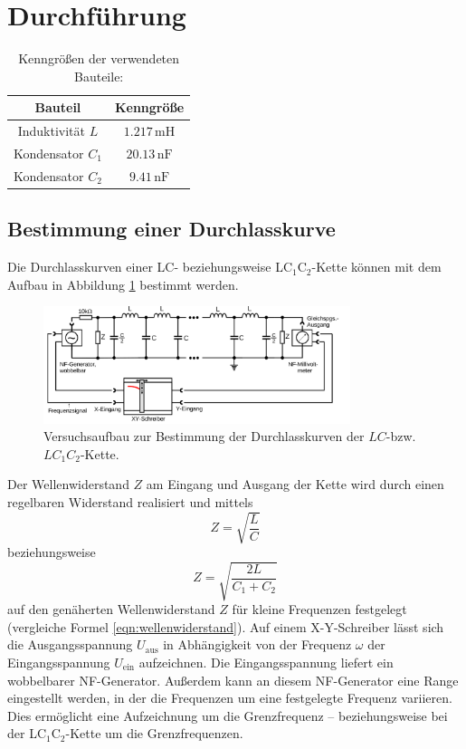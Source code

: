 \section{Durchführung}
\label{sec:Durchführung}

\begin{table}
	\caption{Kenngrößen der verwendeten Bauteile: }
	\label{tab:bauteile}
	\centering
	\begin{tabular}{cc}
		\toprule
		Bauteil            & Kenngröße                 \\
		\midrule
		Induktivität $L $ & $1.217 \,\si{\milli\henry}$ \\
		Kondensator $C_1$  & $20.13 \,\si{\nano\farad}$  \\
		Kondensator $C_2$  & $9.41\,\si{\nano\farad}$    \\
		\bottomrule
	\end{tabular}
\end{table}
\subsection{Bestimmung einer Durchlasskurve}
Die Durchlasskurven einer LC- beziehungsweise LC$_1$C$_2$-Kette können
mit dem Aufbau in Abbildung \ref{fig:durchlasskurve} bestimmt werden.
\begin{figure}
	\centering
	\includegraphics[width=0.8\textwidth]{Bilder/durchlasskurve.png}
	\caption{Versuchsaufbau zur Bestimmung der Durchlasskurven der $LC$-bzw. $LC_1C_2$-Kette. \cite{Anleitung}}
	\label{fig:durchlasskurve}
\end{figure}
Der Wellenwiderstand $Z$ am Eingang und Ausgang der Kette wird durch einen
regelbaren Widerstand realisiert und mittels
\begin{equation}
	Z = \sqrt{\frac{L}{C}}
\end{equation}
beziehungsweise
\begin{equation}
	Z = \sqrt{\frac{2L}{C_1+C_2}}
\end{equation}
auf den genäherten Wellenwiderstand $Z$ für kleine Frequenzen festgelegt (vergleiche Formel \eqref{eqn:wellenwiderstand}).
Auf einem X-Y-Schreiber lässt sich die Ausgangsspannung $U_{\text{aus}}$ in Abhängigkeit von der Frequenz $\omega$ der Eingangsspannung $U_{\text{ein}}$ aufzeichnen.
Die Eingangsspannung liefert ein wobbelbarer NF-Generator.
Außerdem kann an diesem NF-Generator eine Range eingestellt werden, in der die Frequenzen um eine festgelegte Frequenz variieren.
Dies ermöglicht eine Aufzeichnung um die Grenzfrequenz -- beziehungsweise
bei der LC$_1$C$_2$-Kette um die Grenzfrequenzen.

